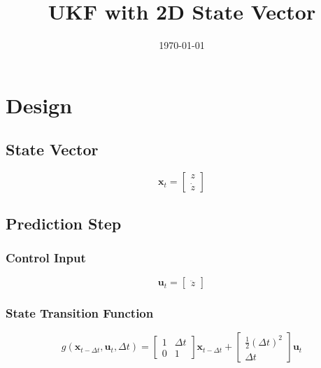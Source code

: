 \documentclass{article}
\title{UKF with 2D State Vector}
\author{}
\date{\today}
\begin{document}
\maketitle

\section{Design}

\subsection{State Vector}

\begin{equation}
  \mathbf{x}_t=\begin{bmatrix}
  z \\
  \dot z
  \end{bmatrix}
\end{equation}

\subsection{Prediction Step}

\subsubsection{Control Input}

\begin{equation}
  \mathbf{u}_t = \begin{bmatrix}
  \ddot z
  \end{bmatrix}
\end{equation}

\subsubsection{State Transition Function}

\begin{equation}
  g(\mathbf{x}_{t-\Delta t}, \mathbf{u}_t, \Delta t) = \begin{bmatrix}
  1 & \Delta t \\
  0 & 1
\end{bmatrix}\mathbf{x}_{t-\Delta t} + \begin{bmatrix}
  \frac{1}{2}(\Delta t)^2 \\
  \Delta t
  \end{bmatrix}\mathbf{u}_t
\end{equation}
\end{document}
